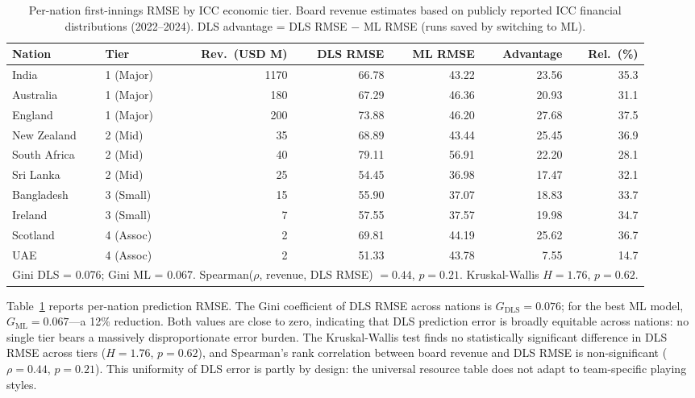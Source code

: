 \documentclass[10pt,a4paper,twocolumn]{article}
\begin{document}
\begin{table}[htbp]
\centering
\caption{Per-nation first-innings RMSE by ICC economic tier. Board revenue estimates based on publicly reported ICC financial distributions (2022--2024). DLS advantage = DLS RMSE $-$ ML RMSE (runs saved by switching to ML).}
\label{tab:econ_fairness}
\small
\begin{tabular}{llrrrrr}
\toprule
\textbf{Nation} & \textbf{Tier} & \textbf{Rev.\ (USD M)} & \textbf{DLS RMSE} & \textbf{ML RMSE} & \textbf{Advantage} & \textbf{Rel.\ (\%)} \\
\midrule
India           & 1 (Major) & 1170 & 66.78 & 43.22 & 23.56 & 35.3 \\
Australia       & 1 (Major) &  180 & 67.29 & 46.36 & 20.93 & 31.1 \\
England         & 1 (Major) &  200 & 73.88 & 46.20 & 27.68 & 37.5 \\
\midrule
New Zealand     & 2 (Mid)   &   35 & 68.89 & 43.44 & 25.45 & 36.9 \\
South Africa    & 2 (Mid)   &   40 & 79.11 & 56.91 & 22.20 & 28.1 \\
Sri Lanka       & 2 (Mid)   &   25 & 54.45 & 36.98 & 17.47 & 32.1 \\
\midrule
Bangladesh      & 3 (Small) &   15 & 55.90 & 37.07 & 18.83 & 33.7 \\
Ireland         & 3 (Small) &    7 & 57.55 & 37.57 & 19.98 & 34.7 \\
\midrule
Scotland        & 4 (Assoc) &    2 & 69.81 & 44.19 & 25.62 & 36.7 \\
UAE             & 4 (Assoc) &    2 & 51.33 & 43.78 &  7.55 & 14.7 \\
\midrule
\multicolumn{7}{l}{\small Gini DLS = 0.076; Gini ML = 0.067. Spearman($\rho$, revenue, DLS RMSE) $= 0.44$, $p=0.21$. Kruskal-Wallis $H=1.76$, $p=0.62$.} \\
\bottomrule
\end{tabular}
\end{table}

Table~\ref{tab:econ_fairness} reports per-nation prediction RMSE. The Gini coefficient of DLS RMSE across nations is $G_\text{DLS} = 0.076$; for the best ML model, $G_\text{ML} = 0.067$---a 12\% reduction. Both values are close to zero, indicating that DLS prediction error is broadly equitable across nations: no single tier bears a massively disproportionate error burden. The Kruskal-Wallis test finds no statistically significant difference in DLS RMSE across tiers ($H=1.76$, $p=0.62$), and Spearman's rank correlation between board revenue and DLS RMSE is non-significant ($\rho=0.44$, $p=0.21$). This uniformity of DLS error is partly by design: the universal resource table does not adapt to team-specific playing styles.
\end{document}
